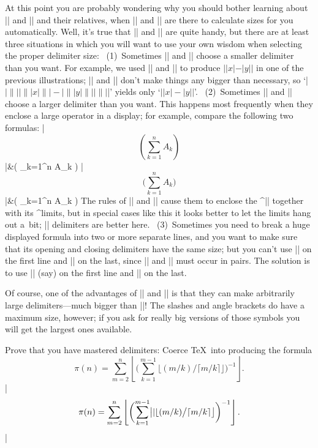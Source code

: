 At this point you are probably wondering why you should bother learning about
|\bigl| and |\bigr| and their relatives, when |\left| and |\right| are there
to calculate sizes for you automatically. Well, it's true that |\left|
and |\right| are quite handy, but there are at least three situations in which
you will want to use your own wisdom when selecting the proper delimiter size:
\ (1)~Sometimes |\left| and |\right| choose a smaller delimiter than you want.
For example, we used |\bigl| and |\bigr| to produce $\bigl\vert\vert x\vert-
\vert y\vert\bigr\vert$ in one of the previous illustrations; |\left| and
|\right| don't make things any bigger than necessary, so
`|$\left|\||\left|\||x\right|\||-\left|\||y\right|\||\right|\||$|'
yields only
`$\left\vert \left\vert x\right\vert -\left\vert y\right\vert \right\vert$'.
\ (2)~Sometimes |\left| and |\right| choose a larger delimiter than you want.
This happens most frequently when they enclose a large operator in a display;
for example, compare the following two formulas:
\beginlongdisplaymathdemo
\noalign{\vskip 6pt}
|$$\left( \sum_{k=1}^n A_k \right)$$|&\left( \sum_{k=1}^n A_k \right)\cr
\noalign{\vskip 3pt}
|$$\biggl( \sum_{k=1}^n A_k \biggr)$$|&\biggl( \sum_{k=1}^n A_k \biggr)\cr
\endmathdemo
The rules of\/ |\left| and |\right| cause them to enclose the ^|\sum| together
with its ^{limits}, but in special cases like this it looks better to let
the limits hang out a~bit; |\bigg| delimiters are better here.
\ (3)~Sometimes you need to break a huge displayed
formula into two or more separate lines, and you want to make sure that
its opening and closing delimiters have the same size; but you can't use
|\left| on the first line and |\right| on the last, since |\left| and
|\right| must occur in pairs. The solution is to use |\Biggl| (say) on
the first line and |\Biggr| on the last.

\danger Of course, one of the advantages of\/ |\left| and |\right| is that
they can make arbitrarily large delimiters---much bigger than |\biggggg|!
The slashes and angle brackets do have a maximum size, however; if you
ask for really big versions of those symbols you will get the largest
ones available.

\exercise Prove that you have mastered delimiters: Coerce \TeX\ into
producing the formula
$$\pi(n)=\sum_{m=2}^n\left\lfloor\biggl(\sum_{k=1}^{m-1}\bigl\lfloor
  (m/k)\big/\lceil m/k\rceil\bigr\rfloor\biggr)^{-1}\right\rfloor.$$
\answer |$$\pi(n)=\sum_{m=2}^n\left\lfloor\biggl(\sum_{k=1}^{m-1}\bigl|
\hfil\break
|\lfloor(m/k)\big/\lceil m/k\rceil\bigr\rfloor\biggr)^{-1}\right\rfloor.$$|


